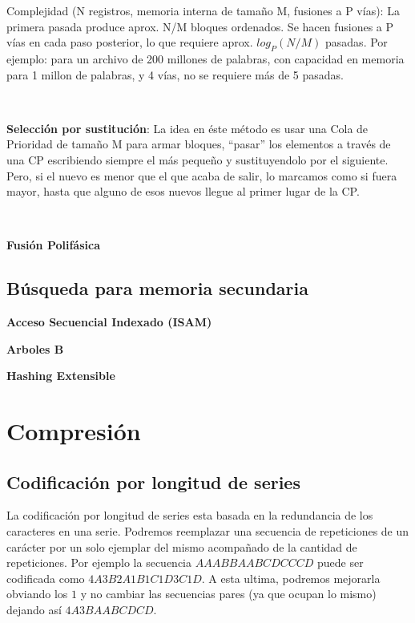  Complejidad (N registros, memoria interna de tamaño M, fusiones a P v\'ias): La primera pasada produce aprox. N/M bloques ordenados. Se hacen fusiones a P v\'ias en cada paso posterior, lo que requiere aprox. $log_P(N/M)$ pasadas.
 Por ejemplo: para un archivo de 200 millones de palabras, con capacidad en memoria para 1 millon de palabras, y 4 v\'ias, no se requiere m\'as de 5 pasadas.

~

\textbf{Selecci\'on por sustituci\'on}: La idea en \'este m\'etodo es usar una Cola de Prioridad de tamaño M para armar bloques, ``pasar'' los elementos a trav\'es de una CP escribiendo siempre el m\'as pequeño y sustituyendolo por el siguiente. Pero, si el nuevo es menor que el que acaba de salir, lo marcamos como si fuera mayor, hasta que alguno de esos nuevos llegue al primer lugar de la CP.

~

\textbf{Fusi\'on Polif\'asica}

\subsection{B\'usqueda para memoria secundaria}

\textbf{Acceso Secuencial Indexado (ISAM)}

\textbf{Arboles B}

\textbf{Hashing Extensible}

\newpage
\section{Compresi\'on}
\subsection{Codificaci\'on por longitud de series}

La codificaci\'on por longitud de series esta basada en la redundancia de los caracteres en una serie. Podremos reemplazar una secuencia de repeticiones de un car\'acter por un solo ejemplar del mismo acompa\~nado de la cantidad de repeticiones. Por ejemplo la secuencia $AAABBAABCDCCCD$ puede ser codificada como $4A3B2A1B1C1D3C1D$. A esta ultima, podremos mejorarla obviando los $1$ y no cambiar las secuencias pares (ya que ocupan lo mismo) dejando as\'i $4A3BAABCDCD$.

~

